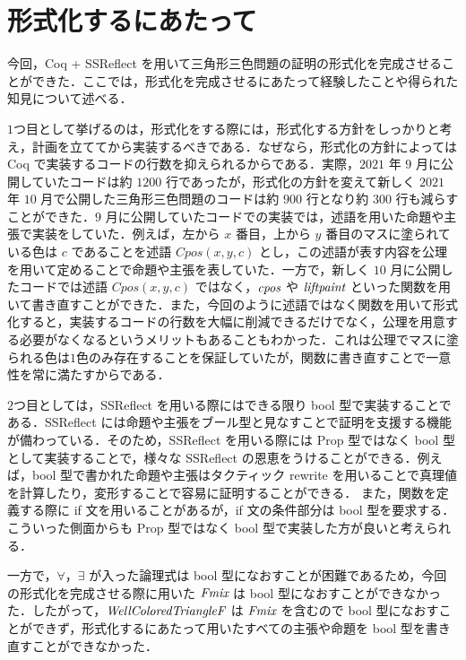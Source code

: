 \section{形式化するにあたって}
今回，Coq + SSReflect を用いて三角形三色問題の証明の形式化を完成させることができた．ここでは，形式化を完成させるにあたって経験したことや得られた知見について述べる．

$1$つ目として挙げるのは，形式化をする際には，形式化する方針をしっかりと考え，計画を立ててから実装するべきである．なぜなら，形式化の方針によっては Coq で実装するコードの行数を抑えられるからである．実際，$2021$ 年 $9$ 月に公開していたコードは約 $1200$ 行であったが，形式化の方針を変えて新しく $2021$ 年 $10$ 月で公開した三角形三色問題のコードは約 $900$ 行となり約 $300$ 行も減らすことができた．$9$ 月に公開していたコードでの実装では，述語を用いた命題や主張で実装をしていた．例えば，左から $x$ 番目，上から $y$ 番目のマスに塗られている色は $c$ であることを述語 $Cpos(x,y,c)$ とし，この述語が表す内容を公理を用いて定めることで命題や主張を表していた．一方で，新しく $10$ 月に公開したコードでは述語 $Cpos(x,y,c)$ ではなく，$\textit{cpos}$ や $\textit{liftpaint}$ といった関数を用いて書き直すことができた．また，今回のように述語ではなく関数を用いて形式化すると，実装するコードの行数を大幅に削減できるだけでなく，公理を用意する必要がなくなるというメリットもあることもわかった．これは公理でマスに塗られる色は$1$色のみ存在することを保証していたが，関数に書き直すことで一意性を常に満たすからである．

$2$つ目としては，SSReflect を用いる際にはできる限り bool 型で実装することである．SSReflect には命題や主張をブール型と見なすことで証明を支援する機能が備わっている．そのため，SSReflect を用いる際には Prop 型ではなく bool 型として実装することで，様々な SSReflect の恩恵をうけることができる．例えば，bool 型で書かれた命題や主張はタクティック rewrite を用いることで真理値を計算したり，変形することで容易に証明することができる．
また，関数を定義する際に if 文を用いることがあるが，if 文の条件部分は bool 型を要求する．こういった側面からも Prop 型ではなく bool 型で実装した方が良いと考えられる．

一方で，$\forall$，$\exists$ が入った論理式は bool 型になおすことが困難であるため，今回の形式化を完成させる際に用いた $\textit{Fmix}$ は bool 型になおすことができなかった．したがって，$\textit{WellColoredTriangleF}$ は $\textit{Fmix}$ を含むので bool 型になおすことができず，形式化するにあたって用いたすべての主張や命題を bool 型を書き直すことができなかった．



